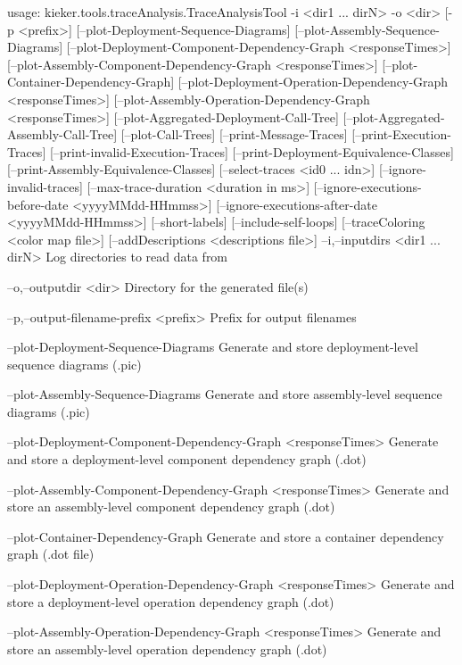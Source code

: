 usage: kieker.tools.traceAnalysis.TraceAnalysisTool -i <dir1 ... dirN> -o <dir>
       [-p <prefix>] [--plot-Deployment-Sequence-Diagrams]
       [--plot-Assembly-Sequence-Diagrams]
       [--plot-Deployment-Component-Dependency-Graph <responseTimes>]
       [--plot-Assembly-Component-Dependency-Graph <responseTimes>]
       [--plot-Container-Dependency-Graph]
       [--plot-Deployment-Operation-Dependency-Graph <responseTimes>]
       [--plot-Assembly-Operation-Dependency-Graph <responseTimes>]
       [--plot-Aggregated-Deployment-Call-Tree]
       [--plot-Aggregated-Assembly-Call-Tree] [--plot-Call-Trees]
       [--print-Message-Traces] [--print-Execution-Traces]
       [--print-invalid-Execution-Traces]
       [--print-Deployment-Equivalence-Classes]
       [--print-Assembly-Equivalence-Classes] [--select-traces <id0 ... idn>]
       [--ignore-invalid-traces] [--max-trace-duration <duration in ms>]
       [--ignore-executions-before-date <yyyyMMdd-HHmmss>]
       [--ignore-executions-after-date <yyyyMMdd-HHmmss>] [--short-labels]
       [--include-self-loops] [--traceColoring <color map file>]
       [--addDescriptions <descriptions file>]
 --i,--inputdirs <dir1 ... dirN>
        Log directories to read data from

 --o,--outputdir <dir>
        Directory for the generated file(s)

 --p,--output-filename-prefix <prefix>
        Prefix for output filenames
        

    --plot-Deployment-Sequence-Diagrams
        Generate and store deployment-level sequence diagrams (.pic)

    --plot-Assembly-Sequence-Diagrams
        Generate and store assembly-level sequence diagrams (.pic)

    --plot-Deployment-Component-Dependency-Graph <responseTimes>
        Generate and store a deployment-level component dependency graph (.dot)

    --plot-Assembly-Component-Dependency-Graph <responseTimes>
        Generate and store an assembly-level component dependency graph (.dot)

    --plot-Container-Dependency-Graph
        Generate and store a container dependency graph (.dot file)

    --plot-Deployment-Operation-Dependency-Graph <responseTimes>
        Generate and store a deployment-level operation dependency graph (.dot)

    --plot-Assembly-Operation-Dependency-Graph <responseTimes>
        Generate and store an assembly-level operation dependency graph (.dot)

